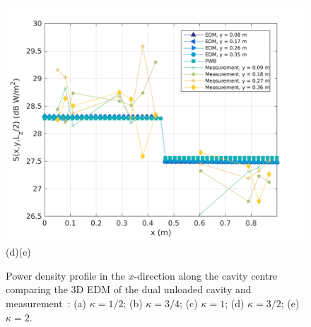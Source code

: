 \documentclass[a4paper]{article}
\numberwithin{equation}{section}
\begin{document}
\begin{figure}[ht]
\begin{center}
\includegraphics[width=0.49\linewidth]{figures/DDM-EEBC_3D_DU_PowerDensityProfileXMeas_JX_k2_0}\\
{\footnotesize (d)\hspace{75mm}(e)}\\
\vspace{-2mm}
\caption{\label{fg:measprofsduk} Power density profile in the $x$-direction along the cavity centre comparing
the 3D EDM of the dual unloaded cavity and measurement~\citep{Flintoft2017b}: (a) $\kappa=1/2$; (b) $\kappa=3/4$;
(c) $\kappa=1$; (d) $\kappa=3/2$; (e) $\kappa=2$.}
\end{center}
\end{figure}
\end{document}
